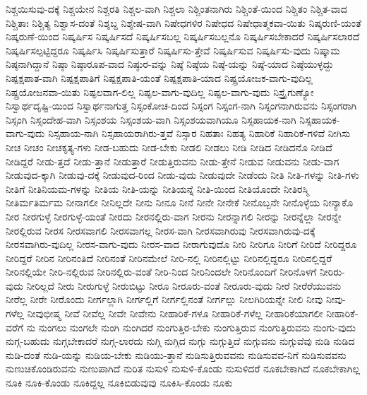 {ನಿಶ್ಚಯಿಸುವು-ದಕ್ಕೆ
ನಿಶ್ಚಯೇನ
ನಿಶ್ಚರತಿ
ನಿಶ್ಚಲ-ವಾಗಿ
ನಿಶ್ಚಲಾ
ನಿಶ್ಚಿಂತನಾಗಿರು
ನಿಶ್ಚಿಂತೆ-ಯಿಂದ
ನಿಶ್ಚಿತಂ
ನಿಶ್ಚಿತ-ವಾದ
ನಿಶ್ಚಿತಾಃ
ನಿಶ್ಚಿತ್ಯ
ನಿಶ್ವಾಸ-ದಂತೆ
ನಿಶ್ಶಬ್ದ
ನಿಶ್ಶೇಷ-ವಾಗಿ
ನಿಷೇಧಗಳಿರ
ನಿಷೇಧದ
ನಿಷೇಧಾತ್ಮಕವಾ-ಯಿತು
ನಿಷ್ಕರುಣಿ-ಯಂತೆ
ನಿಷ್ಕರುಣೆ-ಯಿಂದ
ನಿಷ್ಕರ್ಷಿಸ
ನಿಷ್ಕರ್ಷಿಸದೆ
ನಿಷ್ಕರ್ಷಿಸಬಲ್ಲ
ನಿಷ್ಕರ್ಷಿಸಬಲ್ಲನೊ
ನಿಷ್ಕರ್ಷಿಸಬೇಕಾದರೆ
ನಿಷ್ಕರ್ಷಿಸಲಾರದೆ
ನಿಷ್ಕರ್ಷಿಸಲ್ಪಟ್ಟಿದ್ದರೂ
ನಿಷ್ಕರ್ಷಿಸಿ
ನಿಷ್ಕರ್ಷಿಸುತ್ತಾರೆ
ನಿಷ್ಕರ್ಷಿಸು-ತ್ತೇವೆ
ನಿಷ್ಕರ್ಷಿಸುವ
ನಿಷ್ಕರ್ಷಿಸು-ವುದು
ನಿಷ್ಕಾಮ
ನಿಷ್ಠನಾಗಿದ್ದಾನೆ
ನಿಷ್ಠಾ
ನಿಷ್ಠಾರೂಪ-ವಾದ
ನಿಷ್ಠುರ-ವನ್ನು
ನಿಷ್ಠೆ
ನಿಷ್ಠೆಯ
ನಿಷ್ಠೆ-ಯನ್ನು
ನಿಷ್ಠೆ-ಯಾದ
ನಿಷ್ಠೆಯುಳ್ಳದ್ದು
ನಿಷ್ಪಕ್ಷಪಾತ-ವಾಗಿ
ನಿಷ್ಪಕ್ಷಪಾತಿಗೆ
ನಿಷ್ಪಕ್ಷಪಾತಿ-ಯಂತೆ
ನಿಷ್ಪಕ್ಷಪಾತಿ-ಯಾದ
ನಿಷ್ಪ್ರಯೋಜಕ-ವಾಗು-ವುದಿಲ್ಲ
ನಿಷ್ಪ್ರಯೋಜನವಾ-ಯಿತು
ನಿಷ್ಫಲವಾಗ-ಲಿಲ್ಲ
ನಿಷ್ಫಲ-ವಾಗು-ವುದಿಲ್ಲ
ನಿಷ್ಫಲ-ವಾಗು-ವುದು
ನಿಸ್ತ್ರೈಗುಣ್ಯೋ
ನಿಸ್ವಾರ್ಥದೃಷ್ಟಿ-ಯಿಂದ
ನಿಸ್ವಾರ್ಥನಾಗುತ್ತ
ನಿಸ್ಸಂಕೋಚ-ದಿಂದ
ನಿಸ್ಸಂಗ
ನಿಸ್ಸಂಗ-ನಾಗಿ
ನಿಸ್ಸಂಗನಾಗಿರುವನು
ನಿಸ್ಸಂಗರಾಗಿ
ನಿಸ್ಸಂಗಿ
ನಿಸ್ಸಂದೇಹ-ವಾಗಿ
ನಿಸ್ಸಂಶಯ
ನಿಸ್ಸಂಶಯ-ವಾಗಿ
ನಿಸ್ಸಂಶಯವಾಗಿಯೂ
ನಿಸ್ಸಹಾಯಕ-ನಾಗಿ
ನಿಸ್ಸಹಾಯಕ-ವಾಗು-ವುದು
ನಿಸ್ಸಹಾಯ-ನಾಗಿ
ನಿಸ್ಸಹಾಯರಾಗಿರು-ತ್ತವೆ
ನಿಸ್ಸಾರ
ನಿಹತಾಃ
ನಿಹತ್ಯ
ನಿಹಾರಿಕೆ
ನಿಹಾರಿಕೆ-ಗಳಿವೆ
ನೀಗಿಸು
ನೀಚ
ನೀಚಂ
ನೀಚಕೃತ್ಯ-ಗಳು
ನೀಡ-ಬಹುದು
ನೀಡ-ಬೇಕು
ನೀಡಲಿ
ನೀಡಲು
ನೀಡಿ
ನೀಡಿದ
ನೀಡಿದನೊ
ನೀಡಿದೆ
ನೀಡಿದ್ದರೆ
ನೀಡು-ತ್ತದೆ
ನೀಡು-ತ್ತಾನೆ
ನೀಡುತ್ತಾರೆ
ನೀಡುತ್ತಿರುವನು
ನೀಡು-ತ್ತೇನೆ
ನೀಡುವ
ನೀಡುವನು
ನೀಡು-ವಾಗ
ನೀಡುವುದ-ಕ್ಕಾಗಿ
ನೀಡುವು-ದಕ್ಕೆ
ನೀಡುವುದ-ರಿಂದ
ನೀಡು-ವುದು
ನೀಡುವುದೇ
ನೀಡೆಂದು
ನೀತಿ
ನೀತಿ-ಗಳನ್ನು
ನೀತಿ-ಗಳು
ನೀತಿಗೆ
ನೀತಿನಿಯಮ-ಗಳನ್ನು
ನೀತಿಯ
ನೀತಿ-ಯನ್ನು
ನೀತಿಯನ್ನೆ
ನೀತಿ-ಯಿಂದ
ನೀತಿಯೊಂದೇ
ನೀತಿರಸ್ಮಿ
ನೀತಿರ್ಮತಿರ್ಮಮ
ನೀನಾಗಲೀ
ನೀನಿಲ್ಲದೇ
ನೀನು
ನೀನೂ
ನೀನೆ
ನೀನೇ
ನೀನೇಕೆ
ನೀನೊಬ್ಬನೇ
ನೀನೊಳ್ಳೆಯ
ನೀನ್ಯಾಕೊ
ನೀರ
ನೀರಗುಳ್ಳೆ
ನೀರಗುಳ್ಳೆ-ಯಂತೆ
ನೀರದು
ನೀರನಲ್ಲಿರು-ವಾಗ
ನೀರನು
ನೀರನ್ನಾಗಲಿ
ನೀರನ್ನು
ನೀರನ್ನೆಲ್ಲಾ
ನೀರನ್ನೇ
ನೀರಲ್ಲಿರುವ
ನೀರಸ
ನೀರಸವಾಗಲಿ
ನೀರಸವಾಗಲ್ಲ
ನೀರಸ-ವಾಗಿ
ನೀರಸವಾಗಿರುವು
ನೀರಸವಾಗಿರುವು-ದಕ್ಕೆ
ನೀರಸವಾಗಿರು-ವುದಿಲ್ಲ
ನೀರಸ-ವಾಗು-ವುದು
ನೀರಸ-ವಾದ
ನೀರಾಗುವುದೊ
ನೀರಿ
ನೀರಿಗೂ
ನೀರಿಗೆ
ನೀರಿದೆ
ನೀರಿದ್ದರೂ
ನೀರಿದ್ದರೆ
ನೀರಿನ
ನೀರಿನಂತಿದೆ
ನೀರಿನಂತೆ
ನೀರಿನಮೇಲೆ
ನೀರಿ-ನಲ್ಲಿ
ನೀರಿನಲ್ಲಿಟ್ಟು
ನೀರಿನಲ್ಲಿದ್ದರೂ
ನೀರಿನಲ್ಲಿದ್ದರೆ
ನೀರಿನಲ್ಲಿಯೇ
ನೀರಿ-ನಲ್ಲಿರುವ
ನೀರಿನಲ್ಲಿರು-ವಂತೆ
ನೀರಿ-ನಿಂದ
ನೀರಿನಿಂದಲೇ
ನೀರಿನೊಂದಿಗೆ
ನೀರಿನೊಳಗೆ
ನೀರಿರು-ವುದು
ನೀರಿಲ್ಲದೆ
ನೀರು
ನೀರುಗುಳ್ಳೆ
ನೀರುಬಿಟ್ಟು
ನೀರೂ
ನೀರೂರು-ವಂತೆ
ನೀರೂರು-ವುದು
ನೀರೆ
ನೀರೆರೆಯುವನು
ನೀರೆಲ್ಲ
ನೀರೇ
ನೀರೊಂದು
ನೀರ್ಗಲ್ಲಾಗಿ
ನೀರ್ಗಲ್ಲಿಗೆ
ನೀರ್ಗಲ್ಲಿನಂತೆ
ನೀರ್ಗಲ್ಲು
ನೀಲಗಿರಿಯನ್ನೇ
ನೀಲಿ
ನೀವು
ನೀವು-ಗಳೆಲ್ಲ
ನೀವುಭೀಷ್ಮ
ನೀವೆ
ನೀವೆಲ್ಲ
ನೀವೇ
ನೀವೇನು
ನೀಹಾರಿಕೆ-ಗಳೂ
ನೀಹಾರಿಕೆ-ಗಳೆಲ್ಲ
ನೀಹಾರಿಕೆಯಾಗಲೀ
ನೀಹಾರಿಕೆ-ವರೆಗೆ
ನು
ನುಂಗಲು
ನುಂಗಲೇ
ನುಂಗಿ
ನುಂಗಿದರೆ
ನುಂಗುತ್ತಿರ-ಬೇಕು
ನುಂಗುತ್ತಿರುವ
ನುಂಗುತ್ತಿರುವನು
ನುಂಗು-ವುದು
ನುಗ್ಗ-ಬಹುದು
ನುಗ್ಗಬೇಕಾದರೆ
ನುಗ್ಗ-ಲಾರದು
ನುಗ್ಗಿ
ನುಗ್ಗಿದ
ನುಗ್ಗು
ನುಗ್ಗುತ್ತಿದೆ
ನುಗ್ಗುವನು
ನುಗ್ಗುವೆವು
ನುಡಿ
ನುಡಿದ
ನುಡಿ-ದಂತೆ
ನುಡಿ-ಯನ್ನು
ನುಡಿಯ-ಬೇಕು
ನುಡಿಯು-ತ್ತಾನೆ
ನುಡಿಸುತ್ತಿರುವವನು
ನುಡಿಸುವವ-ನಿಗೆ
ನುಡಿಸುವವನು
ನುಣುಚಿಕೊಂಡಿರುವನು
ನುಣುಪಾಗಿದೆ
ನುರಿತ
ನುಸುಳಿ
ನುಸುಳಿ-ಕೊಂಡು
ನುಸುಳಿದರೆ
ನೂಕಬೇಕಾಗಿದೆ
ನೂಕಬೇಕಾಗಿಲ್ಲ
ನೂಕಿ
ನೂಕಿ-ಕೊಂಡು
ನೂಕಿದ್ದಲ್ಲ
ನೂಕಿಬಿಡುವುವು
ನೂಕಿಸಿ-ಕೊಂಡು
ನೂಕು
}
